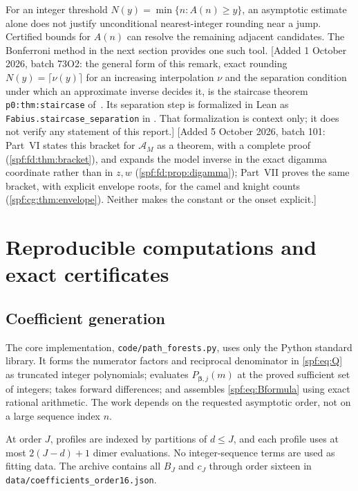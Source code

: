 \documentclass[11pt]{article}
\numberwithin{equation}{section}
\theoremstyle{definition}
\theoremstyle{remark}
\theoremstyle{definition}
\begin{document}
For an integer threshold $N(y)=\min\{n:A(n)\ge y\}$, an asymptotic estimate
alone does not justify unconditional nearest-integer rounding near a jump.
Certified bounds for $A(n)$ can resolve the remaining adjacent candidates.
The Bonferroni method in the next section provides one such tool.
[Added 1 October 2026, batch 73O2: the general form of this remark, exact
rounding $N(y)=\lceil\nu(y)\rceil$ for an increasing interpolation $\nu$ and the
separation condition under which an approximate inverse decides it, is the
staircase theorem \texttt{p0:thm:staircase} of~\cite{tai}. Its separation
step is formalized in Lean as \texttt{Fabius.staircase\_separation} in
.
That formalization is context only; it does not verify any statement of this
report.]
[Added 5 October 2026, batch 101: Part~VI states this bracket for
$\mathcal A_M$ as a theorem, with a complete proof
(\cref{spf:fd:thm:bracket}), and expands the model inverse in the exact
digamma coordinate rather than in $z,w$ (\cref{spf:fd:prop:digamma});
Part~VII proves the same bracket, with explicit envelope roots, for the
camel and knight counts (\cref{spf:cg:thm:envelope}). Neither makes the
constant or the onset explicit.]

\section{Reproducible computations and exact certificates}
\label{spf:sec:computation}

\subsection{Coefficient generation}

The core implementation, \texttt{code/path\_forests.py}, uses only the Python
standard library. It forms the numerator factors and reciprocal denominator
in \eqref{spf:eq:Q} as truncated integer polynomials; evaluates
$P_{\boldsymbol\beta,j}(m)$ at the proved sufficient set of integers; takes
forward differences; and assembles \eqref{spf:eq:Bformula} using exact rational
arithmetic. The work depends on the requested asymptotic order, not on a large
sequence index $n$.

At order $J$, profiles are indexed by partitions of $d\le J$, and each profile
uses at most $2(J-d)+1$ dimer evaluations. No integer-sequence terms are used
as fitting data. The archive contains all $B_J$ and $c_J$ through order sixteen
in \texttt{data/coefficients\_order16.json}.
\end{document}
